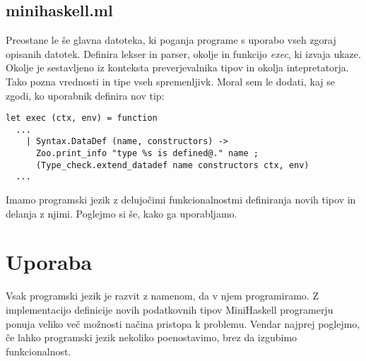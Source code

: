 \documentclass[12pt,a4paper,openany]{book}
\begin{document}
\section{minihaskell.ml}
Preostane le še glavna datoteka, ki poganja programe s uporabo vseh zgoraj opisanih datotek. Definira lekser in parser, okolje in funkcijo \emph{exec}, ki izvaja ukaze. Okolje je sestavljeno 
iz konteksta preverjevalnika tipov in okolja intepretatorja. Tako pozna vrednosti in tipe vseh spremenljivk. Moral sem le dodati, kaj se zgodi, ko uporabnik definira nov tip:
\begin{lstlisting}
let exec (ctx, env) = function
  ...
    | Syntax.DataDef (name, constructors) ->
      Zoo.print_info "type %s is defined@." name ;
      (Type_check.extend_datadef name constructors ctx, env)
  ...
\end{lstlisting}

Imamo programski jezik z delujočimi funkcionalnostmi definiranja novih tipov in delanja z njimi. Poglejmo si še, kako ga uporabljamo.

\chapter{Uporaba}
Vsak programski jezik je razvit z namenom, da v njem programiramo. Z implementacijo definicije novih podatkovnih tipov MiniHaskell programerju 
ponuja veliko več možnosti načina pristopa k problemu. Vendar najprej poglejmo, če lahko programski jezik nekoliko poenostavimo, brez da izgubimo funkcionalnost. 
\end{document}
